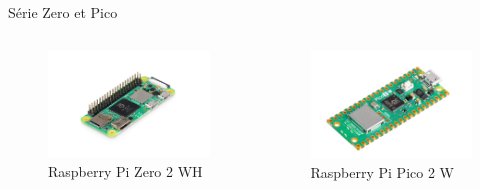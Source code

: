 \documentclass[aspectratio=169,xcolor=dvipsnames]{beamer}
\begin{document}

\begin{frame}{Série Zero et Pico}
    \begin{columns}[c] %

        \begin{figure}
            \includegraphics[width=1\textwidth]{1/rpi-zero.png}
            \captionsetup{labelformat=empty}
            \caption{Raspberry Pi Zero 2 WH}
        \end{figure}

        \begin{figure}
            \includegraphics[width=1\textwidth]{1/rpi-pico.png}
            \captionsetup{labelformat=empty}
            \caption{Raspberry Pi Pico 2 W}
        \end{figure}

    \end{columns}
\end{frame}
\end{document}
